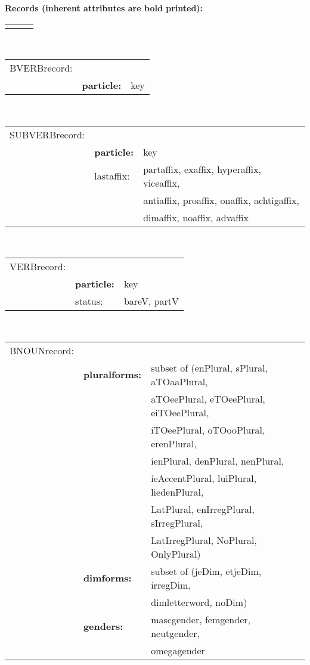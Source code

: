 {\bf Records (inherent attributes are bold printed):}
\\
\begin{tabular}{lll}
             &                    &              \\
\end{tabular}
\\
\begin{tabular}{lll}
BVERBrecord: &                    &              \\
             & {\bf particle:}    & key                               \\
\end{tabular}
\\
\begin{tabular}{lll}
SUBVERBrecord: &                    &              \\
               & {\bf particle:}    & key                               \\
               & lastaffix:     & partaffix, exaffix, hyperaffix, viceaffix,\\
               &                & antiaffix, proaffix, onaffix, achtigaffix,\\
               &                & dimaffix,  noaffix, advaffix  \\
\end{tabular}
\\
\begin{tabular}{lll}
VERBrecord:  &                 &              \\
             & {\bf particle:} & key                               \\
             & status:         & bareV, partV   \\
\end{tabular}
\\
\begin{tabular}{lll}
BNOUNrecord: &                 &              \\
             & {\bf pluralforms:} & subset of (enPlural, sPlural, aTOaaPlural,\\
             &                 & aTOeePlural, eTOeePlural, eiTOeePlural,    \\
             &                 & iTOeePlural, oTOooPlural, erenPlural,      \\
             &                 & ienPlural, denPlural, nenPlural,           \\
             &                 & ieAccentPlural, luiPlural, liedenPlural,   \\
             &                 & LatPlural, enIrregPlural, sIrregPlural,    \\
             &                 & LatIrregPlural, NoPlural, OnlyPlural)      \\  
             & {\bf dimforms:} & subset of (jeDim, etjeDim, irregDim, \\
             &                 & dimletterword, noDim)                \\
             & {\bf genders:}  & mascgender, femgender, neutgender,   \\
             &                 & omegagender                           \\
\end{tabular}
